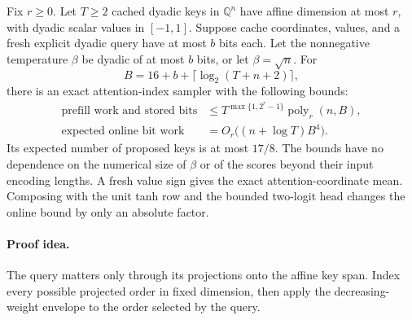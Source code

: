 \begin{theorem}
\label{thm:fixedrankalltemperature}
Fix $r\ge0$.  Let $T\ge2$ cached dyadic keys in $\mathbb Q^n$
have affine dimension at most $r$, with dyadic scalar values in
$[-1,1]$.  Suppose cache coordinates, values, and a fresh explicit dyadic
query have at most $b$ bits each.  Let the nonnegative temperature
$\beta$ be dyadic of at most $b$ bits, or let $\beta=\sqrt n$.
For
\[
 B=16+b+\lceil\log_2(T+n+2)\rceil,
\]
there is an exact attention-index sampler with the following bounds:
\[
 \begin{split}
 \text{prefill work and stored bits}
 &\le T^{\max\{1,2^r-1\}}\operatorname{poly}_r(n,B),\\
 \text{expected online bit work}
 &=O_r\bigl((n+\log T)B^4\bigr).
 \end{split}
\]
Its expected number of proposed keys is at most $17/8$.
The bounds have no dependence on the numerical size of $\beta$
or of the scores beyond their input encoding lengths.  A fresh
value sign gives the exact attention-coordinate mean.  Composing
with the unit tanh row and the bounded two-logit head changes the
online bound by only an absolute factor.
\end{theorem}

\paragraph{Proof idea.}
The query matters only through its projections onto the affine key span.  Index every possible projected order in fixed dimension, then apply the decreasing-weight envelope to the order selected by the query.

